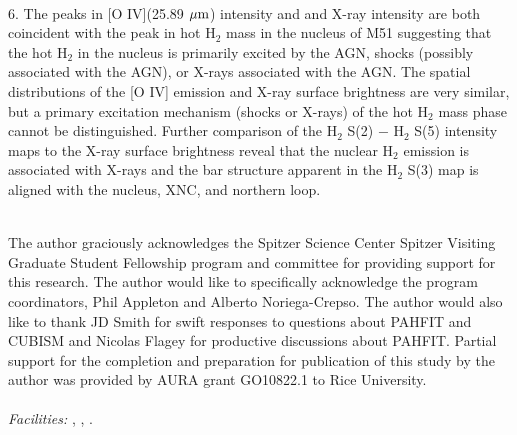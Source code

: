 \documentclass[manuscript]{aastex}
\begin{document}
\\
6.  The peaks in [O IV](25.89 $\mbox{$\mu$m}$) intensity and and X-ray intensity are both coincident with the peak in hot $\mathrm{H_2}$ mass in the nucleus of M51 suggesting that the hot $\mathrm{H_2}$ in the nucleus is primarily excited by the AGN, shocks (possibly associated with the AGN), or X-rays associated with the AGN.  The spatial distributions of the [O IV] emission and X-ray surface brightness are very similar, but a primary excitation mechanism (shocks or X-rays) of the hot $\mathrm{H_2}$ mass phase cannot be distinguished.  Further comparison of the $\mathrm{H_2}$ S(2) $-$ $\mathrm{H_2}$ S(5) intensity maps to the X-ray surface brightness reveal that the nuclear $\mathrm{H_2}$ emission is associated with X-rays and the bar structure apparent in the $\mathrm{H_2}$ S(3) map is aligned with the nucleus, XNC, and northern loop.\\
\\

\acknowledgments

The author graciously acknowledges the Spitzer Science Center Spitzer Visiting Graduate Student Fellowship program and committee for providing support for this research.  The author would like to specifically acknowledge the program coordinators, Phil Appleton and Alberto Noriega-Crepso.  The author would also like to thank JD Smith for swift responses to questions about PAHFIT and CUBISM and Nicolas Flagey for productive discussions about PAHFIT.  Partial support for the completion and preparation for publication of this study by the author was provided by AURA grant GO10822.1 to Rice University.\\
\\
{\it Facilities:} , , .
\end{document}
